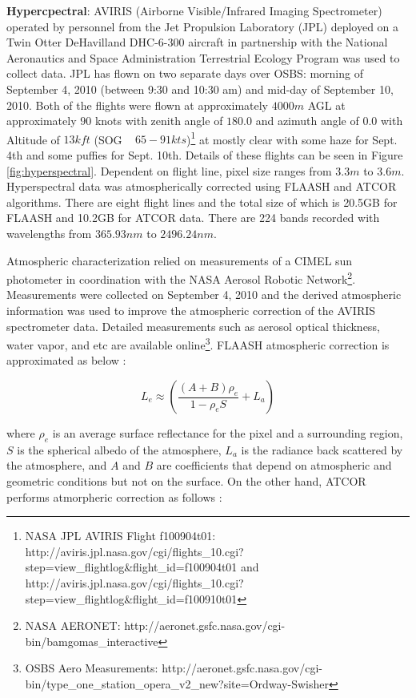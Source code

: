 \documentclass[remotesensing,article,accept,moreauthors,pdftex,12pt,a4paper]{mdpi}
\begin{document}
\textbf{Hypercpectral}: 
AVIRIS (Airborne Visible/Infrared Imaging Spectrometer) operated by personnel from the Jet Propulsion Laboratory (JPL) deployed on a Twin Otter DeHavilland DHC-6-300 aircraft in partnership with the National Aeronautics and Space Administration Terrestrial Ecology Program was used to collect data. 
JPL has flown on two separate days over OSBS: morning of September 4, 2010 (between 9:30 and 10:30 am) and mid-day of September 10, 2010. 
Both of the flights were flown at approximately $4000m$ AGL at approximately $90$ knots with zenith angle of $180.0$ and azimuth angle of $0.0$ with Altitude of $13kft$ (SOG ~ $65-91kts$)\footnote{NASA JPL AVIRIS Flight f100904t01: http://aviris.jpl.nasa.gov/cgi/flights\_10.cgi?step=view\_flightlog\&flight\_id=f100904t01 and http://aviris.jpl.nasa.gov/cgi/flights\_10.cgi?step=view\_flightlog\&flight\_id=f100910t01} at mostly clear with some haze for Sept. 4th and some puffies for Sept. 10th. 
Details of these flights can be seen in Figure \ref{fig:hyperspectral}. 
Dependent on flight line, pixel size ranges from $3.3m$ to $3.6m$. 
Hyperspectral data was atmospherically corrected using FLAASH \cite{adler1998flaash} and ATCOR \cite{richter2005atmospheric} algorithms. 
There are eight flight lines and the total size of which is 20.5GB for FLAASH and 10.2GB for ATCOR data. 
There are 224 bands recorded with wavelengths from $365.93 nm$ to $2496.24 nm$. 

Atmospheric characterization relied on measurements of a CIMEL sun photometer in coordination with the NASA Aerosol Robotic Network\footnote{NASA AERONET: http://aeronet.gsfc.nasa.gov/cgi-bin/bamgomas\_interactive}. 
Measurements were collected on September 4, 2010 and the derived atmospheric information was used to improve the atmospheric correction of the AVIRIS spectrometer data. 
Detailed measurements such as aerosol optical thickness, water vapor, and etc are available online\footnote{OSBS Aero Measurements: http://aeronet.gsfc.nasa.gov/cgi-bin/type\_one\_station\_opera\_v2\_new?site=Ordway-Swisher}. 
FLAASH atmospheric correction is approximated as below \cite{adler1999atmospheric}:

\begin{equation}
L_e \approx (\frac{(A+B)\rho_e}{1-\rho_e S}+L_a)
\end{equation}

where $ \rho_e$ is an average surface reflectance for the pixel and a surrounding region, $S$ is the spherical albedo of the atmosphere, $L_a$ is the radiance back scattered by the atmosphere, and $A$ and $B$ are coefficients that depend on atmospheric and geometric conditions but not on the surface. 
On the other hand, ATCOR performs atmorpheric correction as follows \cite{Richter2014atcor}:
\end{document}
